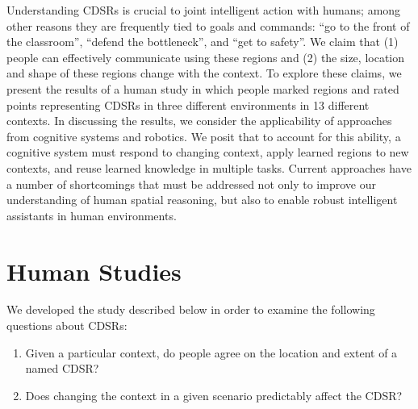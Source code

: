 \documentclass[11pt,letterpaper]{article}
\begin{document}
Understanding CDSRs is crucial to joint intelligent action with humans; among other reasons they are frequently tied to goals and commands: ``go to the front of the classroom'', ``defend the bottleneck'', and ``get to safety''.  We claim that (1) people can effectively communicate using these regions and (2) the size, location and shape of these regions change with the context.  To explore these claims, we present the results of a human study in which people marked regions and rated points representing CDSRs in three different environments in 13 different contexts.  In discussing the results, we consider the applicability of approaches from cognitive systems and robotics.  We posit that to account for this ability, a cognitive system must respond to changing context, apply learned regions to new contexts, and reuse learned knowledge in multiple tasks.  Current approaches have a number of shortcomings that must be addressed not only to improve our understanding of human spatial reasoning, but also to enable robust intelligent assistants in human environments.



\section{Human Studies}

We developed the study described below in order to examine the following questions about CDSRs:
\begin{enumerate}
	\item Given a particular context, do people agree on the location and extent of a named CDSR?
	\item Does changing the context in a given scenario predictably affect the CDSR?
\end{enumerate}
\end{document}
